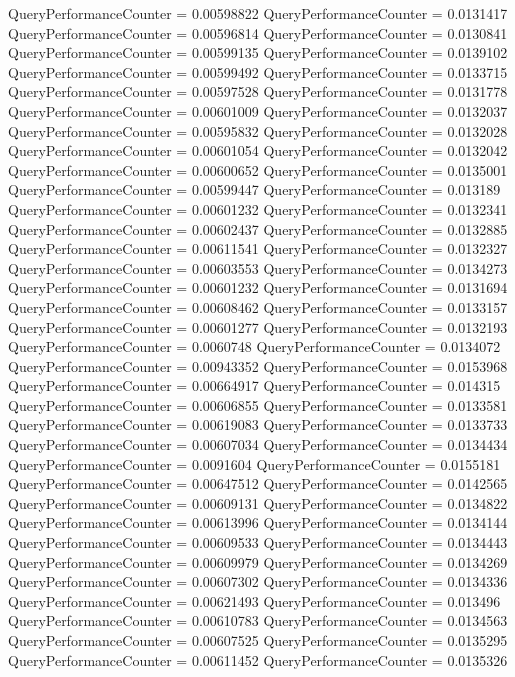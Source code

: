 \documentclass[9pt]{article}
\theoremstyle{plain}
\theoremstyle{definition}
\theoremstyle{remark}
\numberwithin{equation}{section}
\begin{document}
QueryPerformanceCounter  =  0.00598822
QueryPerformanceCounter  =  0.0131417
QueryPerformanceCounter  =  0.00596814
QueryPerformanceCounter  =  0.0130841
QueryPerformanceCounter  =  0.00599135
QueryPerformanceCounter  =  0.0139102
QueryPerformanceCounter  =  0.00599492
QueryPerformanceCounter  =  0.0133715
QueryPerformanceCounter  =  0.00597528
QueryPerformanceCounter  =  0.0131778
QueryPerformanceCounter  =  0.00601009
QueryPerformanceCounter  =  0.0132037
QueryPerformanceCounter  =  0.00595832
QueryPerformanceCounter  =  0.0132028
QueryPerformanceCounter  =  0.00601054
QueryPerformanceCounter  =  0.0132042
QueryPerformanceCounter  =  0.00600652
QueryPerformanceCounter  =  0.0135001
QueryPerformanceCounter  =  0.00599447
QueryPerformanceCounter  =  0.013189
QueryPerformanceCounter  =  0.00601232
QueryPerformanceCounter  =  0.0132341
QueryPerformanceCounter  =  0.00602437
QueryPerformanceCounter  =  0.0132885
QueryPerformanceCounter  =  0.00611541
QueryPerformanceCounter  =  0.0132327
QueryPerformanceCounter  =  0.00603553
QueryPerformanceCounter  =  0.0134273
QueryPerformanceCounter  =  0.00601232
QueryPerformanceCounter  =  0.0131694
QueryPerformanceCounter  =  0.00608462
QueryPerformanceCounter  =  0.0133157
QueryPerformanceCounter  =  0.00601277
QueryPerformanceCounter  =  0.0132193
QueryPerformanceCounter  =  0.0060748
QueryPerformanceCounter  =  0.0134072
QueryPerformanceCounter  =  0.00943352
QueryPerformanceCounter  =  0.0153968
QueryPerformanceCounter  =  0.00664917
QueryPerformanceCounter  =  0.014315
QueryPerformanceCounter  =  0.00606855
QueryPerformanceCounter  =  0.0133581
QueryPerformanceCounter  =  0.00619083
QueryPerformanceCounter  =  0.0133733
QueryPerformanceCounter  =  0.00607034
QueryPerformanceCounter  =  0.0134434
QueryPerformanceCounter  =  0.0091604
QueryPerformanceCounter  =  0.0155181
QueryPerformanceCounter  =  0.00647512
QueryPerformanceCounter  =  0.0142565
QueryPerformanceCounter  =  0.00609131
QueryPerformanceCounter  =  0.0134822
QueryPerformanceCounter  =  0.00613996
QueryPerformanceCounter  =  0.0134144
QueryPerformanceCounter  =  0.00609533
QueryPerformanceCounter  =  0.0134443
QueryPerformanceCounter  =  0.00609979
QueryPerformanceCounter  =  0.0134269
QueryPerformanceCounter  =  0.00607302
QueryPerformanceCounter  =  0.0134336
QueryPerformanceCounter  =  0.00621493
QueryPerformanceCounter  =  0.013496
QueryPerformanceCounter  =  0.00610783
QueryPerformanceCounter  =  0.0134563
QueryPerformanceCounter  =  0.00607525
QueryPerformanceCounter  =  0.0135295
QueryPerformanceCounter  =  0.00611452
QueryPerformanceCounter  =  0.0135326
\end{document}
